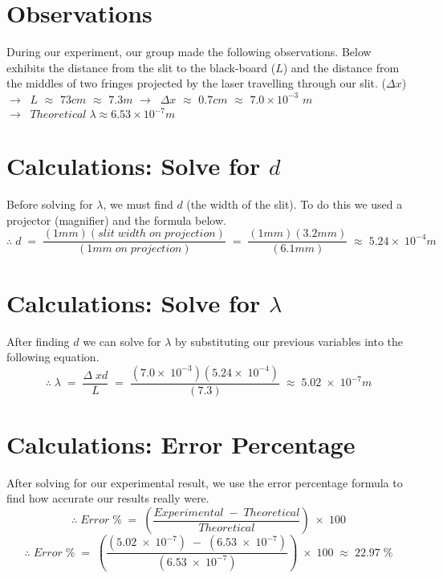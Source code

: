 \documentclass{article}
\begin{document}
\section*{Observations} {
  During our experiment, our group made the following observations. Below exhibits the distance from the slit to the black-board ($L$) and the distance from the middles of two fringes projected by the laser travelling through our slit. ($\Delta x$)\newline\newline
  $\to\;\;L$ $\approx$ $73cm$ $\approx$ $7.3m$\newline\newline
  $\to\;\;\Delta x$ $\approx$ $0.7cm$ $\approx$ $7.0\times 10^{-3}$ $m$\newline\newline
  $\to\;\;Theoretical\;\lambda \approx 6.53 \times 10^{-7}m$\newline
 }
\section*{Calculations: Solve for $d$} {
  Before solving for $\lambda$, we must find $d$ (the width of the slit). To do this we used a projector (magnifier) and the formula below.\newline\newline
  \begin{equation*}
      \therefore\;d\;=\;\frac{(1mm)(slit\;width\;on\;projection)}{(1mm\;on\;projection)}\;=\;\frac{(1mm)(3.2mm)}{(6.1mm)}\;\approx\;5.24\times\;10^{-4}m
  \end{equation*}\leavevmode\newline
 }
\section*{Calculations: Solve for $\lambda$} {
  After finding $d$ we can solve for $\lambda$ by substituting our previous variables into the following equation.\newline\newline
  \begin{equation*}
      \therefore\;\lambda\;=\;\frac{\Delta\;xd}{L}\;=\;\frac{(7.0\times\;10^{-3})(5.24\times\;10^{-4})}{(7.3)}\;\approx\;5.02\;\times\;10^{-7}m
  \end{equation*}\leavevmode\newline
 }
\section*{Calculations: Error Percentage} {
  After solving for our experimental result, we use the error percentage formula to find how accurate our results really were.
  \begin{equation*}
      \therefore\;Error\;\%\;=\;\left(\frac{Experimental\;-\;Theoretical}{Theoretical}\right)\;\times\;100
  \end{equation*}\leavevmode
  \begin{equation*}
      \therefore\;Error\;\%\;=\;\left(\frac{(5.02\;\times\;10^{-7})\;-\;(6.53\;\times\;10^{-7})}{(6.53\;\times\;10^{-7})}\right)\;\times\;100\;\approx\; 22.97\;\%
  \end{equation*}
 }
\end{document}
